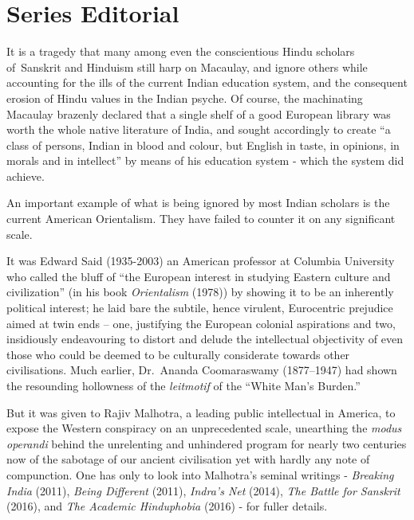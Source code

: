 \chapter*{Series Editorial}\label{gen_editorial}



It is a tragedy that many among even the conscientious Hindu scholars of~Sanskrit and Hinduism still harp on Macaulay, and ignore others while accounting for the ills of the current Indian education system, and the consequent erosion of Hindu values in the Indian psyche. Of course, the machinating Macaulay brazenly declared that a single shelf of a good European library was worth the whole native literature of India, and sought accordingly to create “a class of persons, Indian in blood and colour, but English in taste, in opinions, in morals and in intellect” by means of his education system - which the system did achieve. 

An important example of what is being ignored by most Indian scholars is the current American Orientalism. They have failed to counter it on any significant scale. 

It was Edward Said (1935-2003) an American professor at Columbia University who called the bluff of “the European interest in studying Eastern culture and civilization” (in his book {\sl Orientalism} (1978)) by showing it to be an inherently political interest; he laid bare the subtile, hence virulent, Eurocentric prejudice aimed at twin ends – one, justifying the European colonial aspirations and two, insidiously endeavouring to distort  and delude the intellectual objectivity of even those who could be deemed to be culturally considerate towards other civilisations. Much earlier, Dr.\ Ananda Coomaraswamy (1877--1947) had shown the resounding hollowness of the {\sl leitmotif} of the “White Man’s Burden.” 

But it was given to Rajiv Malhotra, a leading public intellectual in America, to expose the Western conspiracy on an unprecedented scale, unearthing the {\sl modus operandi} behind the unrelenting and unhindered program for nearly two centuries now of the sabotage of our ancient civilisation yet with hardly any note of compunction.  One has only to look into Malhotra’s seminal writings - {\sl Breaking India} (2011), {\sl Being Different} (2011), {\sl Indra’s Net} (2014), {\sl The Battle for Sanskrit} (2016), and {\sl The Academic Hinduphobia} (2016) - for fuller details.
\vskip 1.5pt

